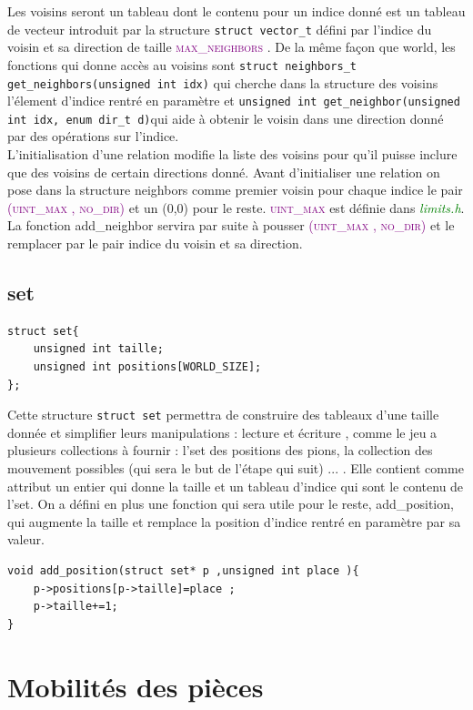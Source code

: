\documentclass[a4paper]{article}
\begin{document}
Les voisins seront un tableau dont le contenu pour un indice donné est un tableau de vecteur introduit par la structure \lstinline|struct vector_t| défini par l’indice
 du voisin et sa direction de taille \textcolor{purple}{\textsc{max\_neighbors}} . De la même façon que world, les fonctions qui donne 
 accès au voisins sont \lstinline|struct neighbors_t get_neighbors(unsigned int idx)| qui cherche dans la structure des voisins 
 l’élement d’indice rentré en paramètre et \lstinline|unsigned int get_neighbor(unsigned int idx, enum dir_t d)|qui aide à obtenir 
 le voisin dans une direction donné par des opérations sur l’indice.\\ 

L’initialisation d’une relation modifie la liste des voisins pour qu’il puisse inclure que des voisins de certain directions donné. 
Avant d’initialiser une relation on pose dans la structure neighbors comme premier voisin pour chaque indice le pair 
\textcolor{purple}{\textsc{(uint\_max , no\_dir)}} et un (0,0) pour le reste. \textcolor{purple}{\textsc{uint\_max}} est définie 
dans \textcolor{green}{\textit{limits.h}}. La fonction add\_neighbor servira par suite à pousser \textcolor{purple}{\textsc{(uint\_max , no\_dir)}} 
et le remplacer par le pair indice du voisin et sa direction.
\subsection{set}
\begin{lstlisting}
struct set{
    unsigned int taille;
    unsigned int positions[WORLD_SIZE];
};
\end{lstlisting}
Cette structure \lstinline|struct set|  permettra de construire des tableaux d’une taille donnée et simplifier leurs 
manipulations : lecture et écriture , comme le jeu a plusieurs collections à fournir : l’set des positions des pions, la 
collection des mouvement possibles (qui sera le but de l’étape qui suit) ... . Elle contient comme attribut un entier qui donne la 
taille et un tableau d'indice qui sont le contenu de l'set.
On a défini en plus une fonction qui sera utile pour le reste, add\_position, qui augmente la taille et remplace la position d’indice 
rentré en paramètre par sa valeur. 
\begin{lstlisting}
void add_position(struct set* p ,unsigned int place ){
    p->positions[p->taille]=place ;
    p->taille+=1;
}
\end{lstlisting}
\section{Mobilités des pièces}
\end{document}
